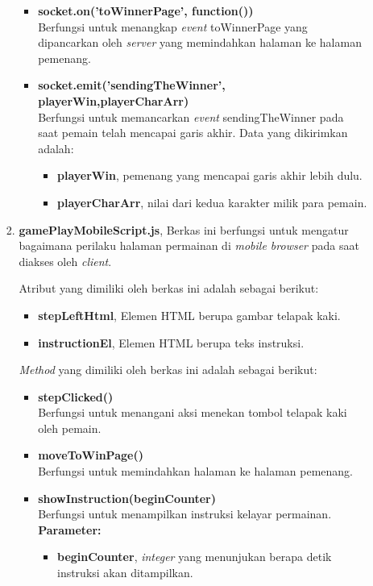 \begin{enumerate}
\begin{enumerate}
\begin{enumerate}
\begin{itemize}
				\item \textbf{socket.on('toWinnerPage', function(){})} \\
				Berfungsi untuk menangkap \textit{event} toWinnerPage yang dipancarkan oleh \textit{server} yang memindahkan halaman ke halaman pemenang.
				
				\item \textbf{socket.emit('sendingTheWinner', {playerWin,playerCharArr})} \\
				Berfungsi untuk memancarkan \textit{event} sendingTheWinner pada saat pemain telah mencapai garis akhir. Data yang dikirimkan adalah:
				\begin{itemize}
					\item \textbf{playerWin}, pemenang yang mencapai garis akhir lebih dulu.
					\item \textbf{playerCharArr}, nilai dari kedua karakter milik para pemain.
				\end{itemize}
			\end{itemize}
			
			\item \textbf{gamePlayMobileScript.js}, Berkas ini berfungsi untuk mengatur bagaimana perilaku halaman permainan di \textit{mobile browser} pada saat diakses oleh \textit{client}.
			
			Atribut yang dimiliki oleh berkas ini adalah sebagai berikut:
			\begin{itemize}
				\item \textbf{stepLeftHtml}, Elemen HTML berupa gambar telapak kaki.
				\item \textbf{instructionEl}, Elemen HTML berupa teks instruksi.
			\end{itemize}
			
			\textit{Method} yang dimiliki oleh berkas ini adalah sebagai berikut:
			\begin{itemize}
				\item \textbf{stepClicked()} \\
				Berfungsi untuk menangani aksi menekan tombol telapak kaki oleh pemain.
				
				\item \textbf{moveToWinPage()} \\
				Berfungsi untuk memindahkan halaman ke halaman pemenang.
				
				\item \textbf{showInstruction(beginCounter)} \\
				Berfungsi untuk menampilkan instruksi kelayar permainan.\\
				\textbf{Parameter:}
				\begin{itemize}
					\item \textbf{beginCounter}, \textit{integer} yang menunjukan berapa detik instruksi akan ditampilkan.
				\end{itemize}
			\end{itemize}
			

\end{enumerate}
\end{enumerate}
\end{enumerate}
